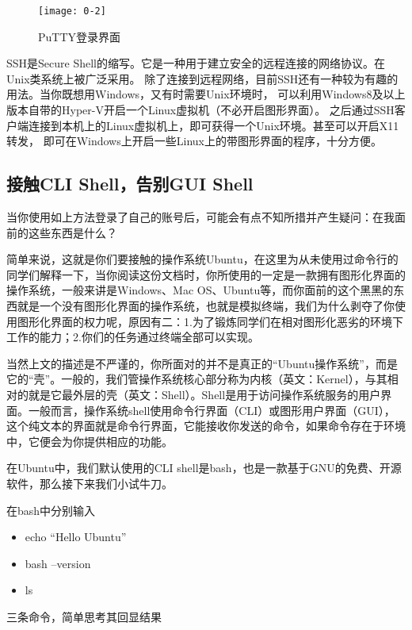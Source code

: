 \begin{figure}[htbp]
  \centering
  \texttt{[image: 0-2]}
  \caption{PuTTY登录界面}\label{fig:0-2}
\end{figure}

\begin{note}
SSH是Secure Shell的缩写。它是一种用于建立安全的远程连接的网络协议。在Unix类系统上被广泛采用。
除了连接到远程网络，目前SSH还有一种较为有趣的用法。当你既想用Windows，又有时需要Unix环境时，
可以利用Windows8及以上版本自带的Hyper-V开启一个Linux虚拟机（不必开启图形界面）。
之后通过SSH客户端连接到本机上的Linux虚拟机上，即可获得一个Unix环境。甚至可以开启X11转发，
即可在Windows上开启一些Linux上的带图形界面的程序，十分方便。
\end{note}

\subsection{接触CLI Shell，告别GUI Shell}

当你使用如上方法登录了自己的账号后，可能会有点不知所措并产生疑问：在我面前的这些东西是什么？

简单来说，这就是你们要接触的操作系统Ubuntu，在这里为从未使用过命令行的同学们解释一下，当你阅读这份文档时，你所使用的一定是一款拥有图形化界面的操作系统，一般来讲是Windows、Mac OS、Ubuntu等，而你面前的这个黑黑的东西就是一个没有图形化界面的操作系统，也就是模拟终端，我们为什么剥夺了你使用图形化界面的权力呢，原因有二：1.为了锻炼同学们在相对图形化恶劣的环境下工作的能力；2.你们的任务通过终端全部可以实现。

当然上文的描述是不严谨的，你所面对的并不是真正的“Ubuntu操作系统”，而是它的“壳”。一般的，我们管操作系统核心部分称为内核（英文：Kernel），与其相对的就是它最外层的壳（英文：Shell）。Shell是用于访问操作系统服务的用户界面。一般而言，操作系统shell使用命令行界面（CLI）或图形用户界面（GUI），这个纯文本的界面就是命令行界面，它能接收你发送的命令，如果命令存在于环境中，它便会为你提供相应的功能。

在Ubuntu中，我们默认使用的CLI shell是bash，也是一款基于GNU的免费、开源软件，那么接下来我们小试牛刀。

\begin{exercise}
在bash中分别输入
  \begin{itemize}
    \item echo “Hello Ubuntu”
    \item bash --version
    \item ls
  \end{itemize}
三条命令，简单思考其回显结果
\end{exercise}

